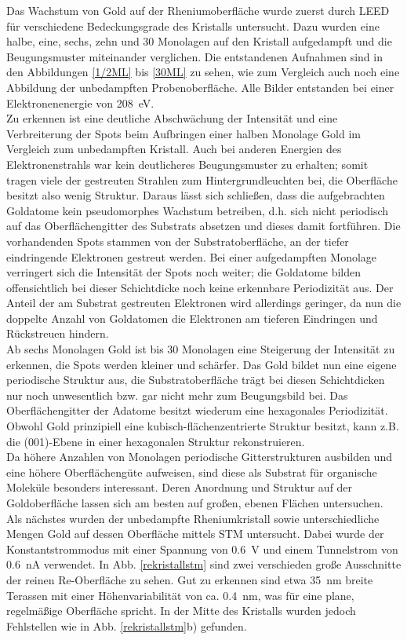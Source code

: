 Das Wachstum von Gold auf der Rheniumoberfläche wurde zuerst durch LEED für
verschiedene Bedeckungsgrade des Kristalls untersucht. Dazu wurden eine halbe, eine, sechs, zehn und
30 Monolagen auf den Kristall aufgedampft und die Beugungsmuster miteinander verglichen. Die
entstandenen Aufnahmen sind in den Abbildungen \ref{1/2ML} bis \ref{30ML} zu sehen, wie zum
Vergleich auch noch eine Abbildung der unbedampften Probenoberfläche. Alle Bilder entstanden
bei einer Elektronenenergie von \SI{208}{eV}.
\\
Zu erkennen ist eine deutliche Abschwächung der Intensität und eine Verbreiterung der Spots beim
Aufbringen einer halben Monolage Gold im Vergleich zum unbedampften Kristall. Auch bei anderen Energien des
Elektronenstrahls war kein deutlicheres Beugungsmuster zu erhalten; somit tragen viele der
gestreuten Strahlen zum Hintergrundleuchten bei, die Oberfläche besitzt also wenig Struktur.
Daraus lässt sich schließen, dass die aufgebrachten Goldatome kein pseudomorphes Wachstum betreiben, d.h.
sich nicht periodisch auf das Oberflächengitter des Substrats absetzen und dieses damit fortführen.
Die vorhandenden Spots stammen von der Substratoberfläche, an der tiefer eindringende Elektronen
gestreut werden. Bei einer aufgedampften Monolage verringert sich die Intensität der Spots noch
weiter; die Goldatome bilden offensichtlich bei dieser Schichtdicke noch keine erkennbare
Periodizität aus. Der Anteil der am Substrat gestreuten Elektronen wird allerdings geringer, da nun
die doppelte Anzahl von Goldatomen die Elektronen am tieferen Eindringen und Rückstreuen hindern.
\\
Ab sechs Monolagen Gold ist bis 30 Monolagen eine Steigerung der Intensität zu erkennen, die Spots
werden kleiner und schärfer. Das Gold bildet nun eine eigene periodische Struktur aus, die
Substratoberfläche trägt bei diesen Schichtdicken nur noch unwesentlich bzw. gar nicht mehr zum
Beugungsbild bei. Das Oberflächengitter der Adatome besitzt wiederum eine hexagonales Periodizität.
Obwohl Gold prinzipiell eine kubisch-flächenzentrierte Struktur besitzt, kann z.B. die (001)-Ebene
in einer hexagonalen Struktur rekonstruieren.
\\
Da höhere Anzahlen von Monolagen periodische Gitterstrukturen ausbilden und eine höhere
Oberflächengüte aufweisen, sind diese als Substrat für organische Moleküle besonders interessant.
Deren Anordnung und Struktur auf der Goldoberfläche lassen sich am besten auf großen, ebenen Flächen
untersuchen.
\\
Als nächstes wurden der unbedampfte Rheniumkristall sowie unterschiedliche Mengen Gold auf dessen
Oberfläche mittels STM untersucht. Dabei wurde der Konstantstrommodus mit einer Spannung von
\SI{0,6}{V} und einem Tunnelstrom von \SI{0,6}{nA} verwendet. In Abb. \ref{rekristallstm} sind zwei
verschieden große Ausschnitte der reinen Re-Oberfläche zu sehen. Gut zu erkennen sind etwa
\SI{35}{nm} breite Terassen mit einer Höhenvariabilität von ca. \SI{0,4}{nm}, was für eine plane,
regelmäßige Oberfläche spricht.
In der
Mitte des Kristalls wurden jedoch Fehlstellen wie in Abb. \ref{rekristallstm}b) gefunden.


